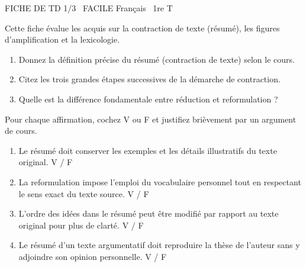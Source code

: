 \documentclass[11pt]{article}
\begin{document}
\begin{tcolorbox}[enhanced,colback=popink,colframe=popink,arc=10pt,boxrule=0pt,left=12pt,right=12pt,top=9pt,bottom=9pt]
{\color{white}\popxbold\small FICHE DE TD 1/3 \textbullet\ FACILE \hfill Français \textbullet\ 1re T\par}
\end{tcolorbox}
\vspace{4pt}
Cette fiche évalue les acquis sur la contraction de texte (résumé), les figures d'amplification et la lexicologie.

\begin{exercice}
\begin{enumerate}
    \item Donnez la définition précise du résumé (contraction de texte) selon le cours.
    \item Citez les trois grandes étapes successives de la démarche de contraction.
    \item Quelle est la différence fondamentale entre \og réduction \fg{} et \og reformulation \fg{} ?
\end{enumerate}
\end{exercice}

\begin{exercice}
Pour chaque affirmation, cochez V ou F et justifiez brièvement par un argument de cours.
\begin{enumerate}
    \item Le résumé doit conserver les exemples et les détails illustratifs du texte original. \hfill V / F
    \item La reformulation impose l'emploi du vocabulaire personnel tout en respectant le sens exact du texte source. \hfill V / F
    \item L'ordre des idées dans le résumé peut être modifié par rapport au texte original pour plus de clarté. \hfill V / F
    \item Le résumé d'un texte argumentatif doit reproduire la thèse de l'auteur sans y adjoindre son opinion personnelle. \hfill V / F
\end{enumerate}
\end{exercice}
\end{document}
